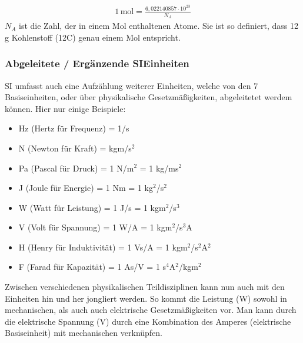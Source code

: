 \documentclass[letterpaper,10pt,english]{jupyterBook}
\begin{document}
\begin{equation*}
\begin{split} 1\,\mathrm{mol} = \frac{6,022 140 857 \cdot 10^23}{N_A}\end{split}
\end{equation*}
\sphinxAtStartPar
\(N_A\) ist die Zahl, der in einem Mol enthaltenen Atome. Sie ist so definiert, dass 12 g Kohlenstoff (12C) genau einem Mol entspricht.

\sphinxAtStartPar
{}


\subsubsection{Abgeleitete / Ergänzende SI\sphinxhyphen{}Einheiten}
\label{\detokenize{content/1_Messen_Einheit:abgeleitete-erganzende-si-einheiten}}
\sphinxAtStartPar


\sphinxAtStartPar
SI umfasst auch eine Aufzählung weiterer Einheiten, welche von den 7 Basiseinheiten, oder über physikalische Gesetzmäßigkeiten, abgeleitetet werdem können. Hier nur einige Beispiele:
\begin{itemize}
\item {} 
 Hz (Hertz für Frequenz) = 1/s

\item {} 
 N (Newton für Kraft) = kgm/s\(^2\)

\item {} 
 Pa (Pascal für Druck) = 1 N/m\(^2\) = 1 kg/ms\(^2\)

\item {} 
 J (Joule für Energie) = 1 Nm = 1 kg\(^2\)/s\(^2\)

\item {} 
 W (Watt für Leistung) = 1 J/s = 1 kgm\(^2\)/s\(^3\)

\item {} 
 V (Volt für Spannung) = 1 W/A = 1 kgm\(^2\)/s\(^3\)A

\item {} 
 H (Henry für Induktivität) = 1 Vs/A = 1 kgm\(^2\)/s\(^2\)A\(^2\)

\item {} 
 F (Farad für Kapazität) = 1 As/V = 1 s\(^4\)A\(^2\)/kgm\(^2\)

\end{itemize}

\sphinxAtStartPar
Zwischen verschiedenen physikalischen Teildisziplinen kann nun auch mit den Einheiten hin und her jongliert werden. So kommt die Leistung (W) sowohl in mechanischen, als auch auch elektrische Gesetzmäßigkeiten vor. Man kann durch die elektrische Spannung (V) durch eine Kombination des Amperes (elektrische Basiseinheit) mit mechanischen verknüpfen.
\end{document}
